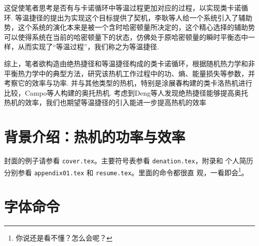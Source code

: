这促使笔者思考是否有与卡诺循环中等温过程更加对应的过程，以实现类卡诺循环. 等温捷径\cite{Li2016}的提出为实现这个目标提供了契机，李耿等人给一个系统引入了辅助势，这个系统的演化本来是被一个含时哈密顿量所决定的，这个精心选择的辅助势可以使得系统在当前的哈密顿量下的状态，仿佛处于原哈密顿量的瞬时平衡态中一样，从而实现了“等温过程”，我们称之为等温捷径.

综上，笔者欲构造由绝热捷径和等温捷径构成的类卡诺循环，根据随机热力学和非平衡热力学中的典型方法，研究该热机工作过程中的功、熵、能量损失等参数，并考察它的效率与功率. 并与其他类型的热机，特别是涂展春构建的类卡洛热机\cite{Tu2013}进行比较，Campo等人构建的奥托热机\cite{DelCampo2014}. 考虑到Deng等人发现绝热捷径能够提高奥托热机的效率\cite{Deng2013}，我们也期望等温捷径的引入能进一步提高热机的效率



\section{背景介绍：热机的功率与效率}
封面的例子请参看 \texttt{cover.tex}。主要符号表参看 \texttt{denation.tex}，附录和
个人简历分别参看 \texttt{appendix01.tex} 和 \texttt{resume.tex}。里面的命令都很直
观，一看即会\footnote{你说还是看不懂？怎么会呢？}。

\section{字体命令}

